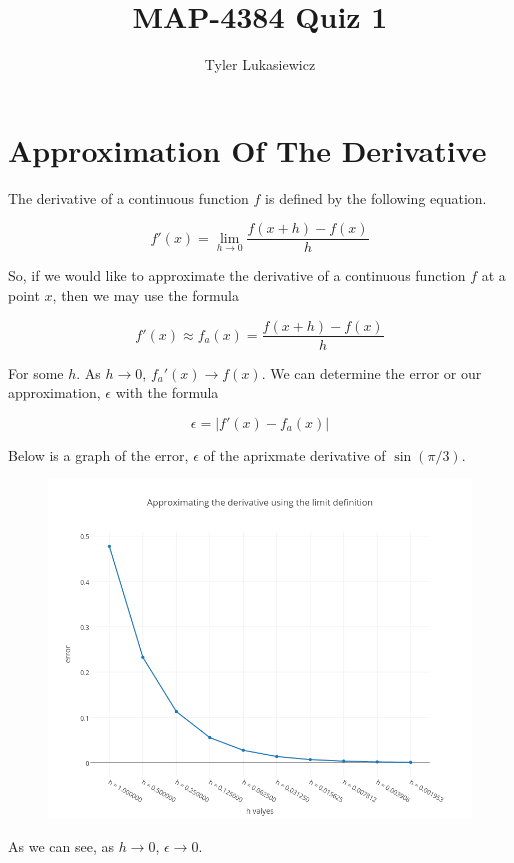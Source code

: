 \documentclass{article}
\title{MAP-4384 Quiz 1}
\author{Tyler Lukasiewicz }
\begin{document}
\maketitle

    \section{Approximation Of The Derivative}
    The derivative of a continuous function $f$ is defined by the following equation. 

    \begin{equation}
        f'(x) = \lim _ {h \to 0 } \frac{f(x+h) - f(x)}{h} 
    \end{equation}

    So, if we would like to approximate the derivative of a continuous function $f$ at a point $x$, then we may use the formula

    \begin{equation}
        f'(x) \approx  f_a(x) = \frac{f(x+h) - f(x)}{h} 
    \end{equation}

    For some $h$. As $h \to 0$, $f_a'(x) \to f(x)$. We can determine the error or our approximation,  $\epsilon$ with the formula 

    \begin{equation}
        \epsilon = |f'(x) - f_a(x)|
    \end{equation}

    Below is a graph of the error, $\epsilon$ of the  aprixmate derivative of $\sin (\pi / 3)$.

    \begin{figure}[!ht]
       \begin{center}
           \includegraphics[scale=.25]{graph}
       \end{center}
        \label{fig:1}
    \end{figure}

    As we can see, as $h \to 0$, $\epsilon \to 0$.
\end{document}
